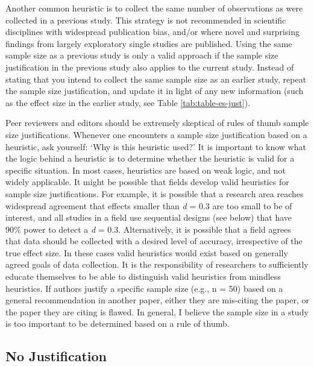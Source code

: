 \documentclass[
  english,
  ,jou, a4paper,floatsintext]{apa6}
\begin{document}
Another common heuristic is to collect the same number of observations as were collected in a previous study. This strategy is not recommended in scientific disciplines with widespread publication bias, and/or where novel and surprising findings from largely exploratory single studies are published. Using the same sample size as a previous study is only a valid approach if the sample size justification in the previous study also applies to the current study. Instead of stating that you intend to collect the same sample size as an earlier study, repeat the sample size justification, and update it in light of any new information (such as the effect size in the earlier study, see Table \ref{tab:table-es-just}).

Peer reviewers and editors should be extremely skeptical of rules of thumb sample size justifications. Whenever one encounters a sample size justification based on a heuristic, ask yourself: `Why is this heuristic used?' It is important to know what the logic behind a heuristic is to determine whether the heuristic is valid for a specific situation. In most cases, heuristics are based on weak logic, and not widely applicable. It might be possible that fields develop valid heuristics for sample size justifications. For example, it is possible that a research area reaches widespread agreement that effects smaller than \emph{d} = 0.3 are too small to be of interest, and all studies in a field use sequential designs (see below) that have 90\% power to detect a \emph{d} = 0.3. Alternatively, it is possible that a field agrees that data should be collected with a desired level of accuracy, irrespective of the true effect size. In these cases valid heuristics would exist based on generally agreed goals of data collection. It is the responsibility of researchers to sufficiently educate themselves to be able to distinguish valid heuristics from mindless heuristics. If authors justify a specific sample size (e.g., n = 50) based on a general recommendation in another paper, either they are mis-citing the paper, or the paper they are citing is flawed. In general, I believe the sample size in a study is too important to be determined based on a rule of thumb.

\hypertarget{no-justification}{%
\subsection{No Justification}\label{no-justification}}
\end{document}
